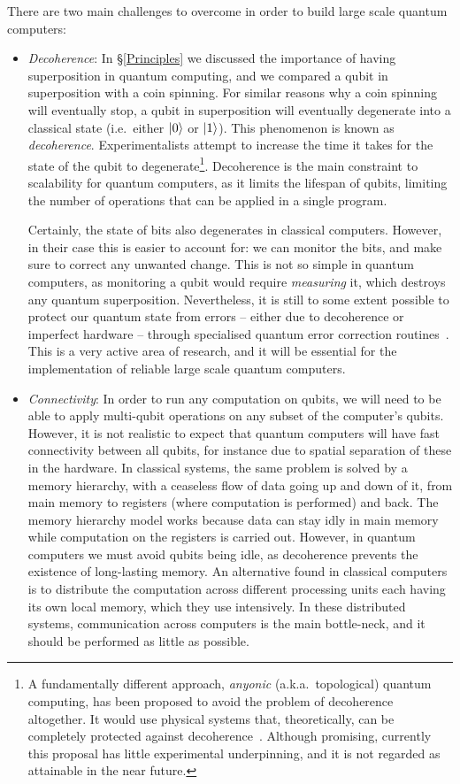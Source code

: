 There are two main challenges to overcome in order to build large scale quantum computers:

\begin{itemize}

\item \textit{Decoherence}: In \S\ref{Principles} we discussed the importance of having superposition in quantum computing, and we compared a qubit in superposition with a coin spinning. For similar reasons why a coin spinning will eventually stop, a qubit in superposition will eventually degenerate into a classical state (i.e.\ either \(\vert 0 \rangle\) or \(\vert 1 \rangle\)). This phenomenon is known as \textit{decoherence}. Experimentalists attempt to increase the time it takes for the state of the qubit to degenerate\footnote{A fundamentally different approach, \textit{anyonic} (a.k.a.\ topological) quantum computing, has been proposed to avoid the problem of decoherence altogether. It would use physical systems that, theoretically, can be completely protected against decoherence~\citep{Anyonic}. Although promising, currently this proposal has little experimental underpinning, and it is not regarded as attainable in the near future.}. Decoherence is the main constraint to scalability for quantum computers, as it limits the lifespan of qubits, limiting the number of operations that can be applied in a single program. 

Certainly, the state of bits also degenerates in classical computers. However, in their case this is easier to account for: we can monitor the bits, and make sure to correct any unwanted change. This is not so simple in quantum computers, as monitoring a qubit would require \textit{measuring} it, which destroys any quantum superposition. Nevertheless, it is still to some extent possible to protect our quantum state from errors -- either due to decoherence or imperfect hardware -- through specialised quantum error correction routines~\citep{QuantumErrorCorrection}. This is a very active area of research, and it will be essential for the implementation of reliable large scale quantum computers.


\item \textit{Connectivity}: In order to run any computation on qubits, we will need to be able to apply multi-qubit operations on any subset of the computer's qubits. However, it is not realistic to expect that quantum computers will have fast connectivity between all qubits, for instance due to spatial separation of these in the hardware. In classical systems, the same problem is solved by a memory hierarchy, with a ceaseless flow of data going up and down of it, from main memory to registers (where computation is performed) and back. The memory hierarchy model works because data can stay idly in main memory while computation on the registers is carried out. However, in quantum computers we must avoid qubits being idle, as decoherence prevents the existence of long-lasting memory. An alternative found in classical computers is to distribute the computation across different processing units each having its own local memory, which they use intensively. In these distributed systems, communication across computers is the main bottle-neck, and it should be performed as little as possible.


\end{itemize}
